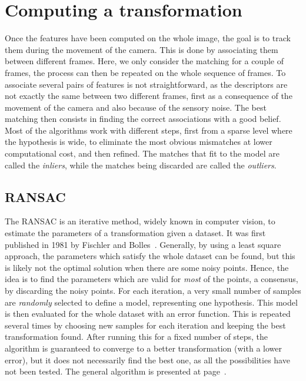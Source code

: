 \section{Computing a transformation}

Once the features have been computed on the whole image, the goal is to track them during the movement of the camera. This is done by associating them between different frames. Here, we only consider the matching for a couple of frames, the process can then be repeated on the whole sequence of frames. To associate several pairs of features is not straightforward, as the descriptors are not exactly the same between two different frames, first as a consequence of the movement of the camera and also because of the sensory noise. The best matching then consists in finding the correct associations with a good belief. Most of the algorithms work with different steps, first from a sparse level where the hypothesis is wide, to eliminate the most obvious mismatches at lower computational cost, and then refined. The matches that fit to the model are called the \emph{inliers}, while the matches being discarded are called the \emph{outliers}.

\subsection{RANSAC}
\label{sub:ransac}

The \gls{RANSAC} is an iterative method, widely known in computer vision, to estimate the parameters of a transformation given a dataset. It was first published in 1981 by Fischler and Bolles~\cite{FischlerB81}. Generally, by using a least square approach, the parameters which satisfy the whole dataset can be found, but this is likely not the optimal solution when there are some noisy points. Hence, the idea is to find the parameters which are valid for \emph{most} of the points, a consensus, by discarding the noisy points. For each iteration, a very small number of samples are \emph{randomly} selected to define a model, representing one hypothesis. This model is then evaluated for the whole dataset with an error function. This is repeated several times by choosing new samples for each iteration and keeping the best transformation found. After running this for a fixed number of steps, the algorithm is guaranteed to converge to a better transformation (with a lower error), but it does not necessarily find the best one, as all the possibilities have not been tested. The general algorithm is presented at page~\pageref{alg:generic_ransac}.

